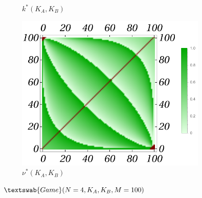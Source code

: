 \documentclass{article}
\theoremstyle{definition}
\newcommand{\G}[1]{$\textswab{Game}(#1)$}
\begin{document}
\begin{figure}[H]
\begin{subfigure}[b]{0.3\textwidth}
        \caption{$k^*(K_A,K_B)$}
        \label{fig:Game4__100_k}
    \end{subfigure}
    \hfill %
    \begin{subfigure}[b]{0.3\textwidth}
        \includegraphics[width=\textwidth]{img/nu_Plot_4_100.pdf}
        \caption{$\nu^*(K_A,K_B)$}
        \label{fig:Game4__100_nu}
    \end{subfigure}
    
    \caption{\G{N=4,K_A,K_B,M=100}}
    \label{fig:Game4__100_Pknu}
\end{figure}
\end{document}
